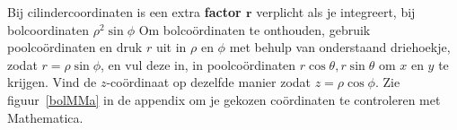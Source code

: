Bij cilindercoordinaten is een extra \textbf{factor $\bm r$} verplicht als je integreert, bij bolcoordinaten $\rho^2 \sin \phi$
Om bolco\"ordinaten te onthouden, gebruik poolco\"ordinaten en druk $r$ uit in $\rho$ en $\phi$ met behulp van onderstaand driehoekje, zodat $r=\rho \sin \phi$, en vul deze in, in poolco\"ordinaten $r \cos \theta,r \sin \theta$ om $x$ en $y$ te krijgen.
Vind de $z$-co\"ordinaat op dezelfde manier zodat $z=\rho \cos \phi$.
Zie figuur~\ref{bolMMa} in de appendix om je gekozen co\"ordinaten te controleren met Mathematica.
